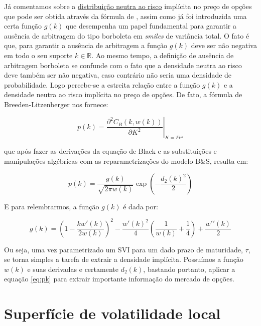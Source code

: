 \documentclass[]{book}
\theoremstyle{definition}
\theoremstyle{definition}
\theoremstyle{definition}
\theoremstyle{remark}
\begin{document}
Já comentamos sobre a \protect\hyperlink{rnd}{distribuição neutra ao
risco} implícita no preço de opções que pode ser obtida através da
fórmula de \citep{Breeden1978}, assim como já foi introduzida uma certa
função \protect\hyperlink{svi}{\(g(k)\)} que desempenha um papel
fundamental para garantir a ausência de arbitragem do tipo borboleta em
\emph{smiles} de variância total. O fato é que, para garantir a ausência
de arbitragem a função \(g(k)\) deve ser não negativa em todo o seu
suporte \(k \in \mathbb R\). Ao mesmo tempo, a definição de ausência de
arbitragem borboleta se confunde com o fato que a densidade neutra ao
risco deve também ser não negativa, caso contrário não seria uma
densidade de probabilidade. Logo percebe-se a estreita relação entre a
função \(g(k)\) e a densidade neutra ao risco implícita no preço de
opções. De fato, a fórmula de Breeden-Litzenberger nos fornece:

\begin{equation}
p(k)=\left.\frac{\partial^2C_B(k, w(k))}{\partial K^2}\right|_{K=Fe^k} 
\end{equation}

que após fazer as derivações da equação de Black e as substituições e
manipulações algébricas com as reparametrizações do modelo B\&S, resulta
em:

\begin{equation}
p(k)=\frac{g(k)}{\sqrt{2\pi w(k)}}\exp\left(-\frac{d_2(k)^2}{2}\right)
\label{eq:pk}
\end{equation}

E para relembrarmos, a função \(g(k)\) é dada por:

\begin{equation}
g(k)=\left(1-\frac{kw\prime(k)}{2w(k)}\right)^2-\frac{w\prime(k)^2}{4}\left(\frac{1}{w(k)}+\frac{1}{4}\right)+\frac{w\prime\prime(k)}{2}
\label{eq:g}
\end{equation}

Ou seja, uma vez parametrizado um SVI para um dado prazo de maturidade,
\(\tau\), se torna simples a tarefa de extrair a densidade implícita.
Possuímos a função \(w(k)\) e suas derivadas e certamente \(d_2(k)\),
bastando portanto, aplicar a equação \eqref{eq:pk} para extrair importante
informação do mercado de opções.

\section{Superfície de volatilidade
local}\label{superficie-de-volatilidade-local}
\end{document}
